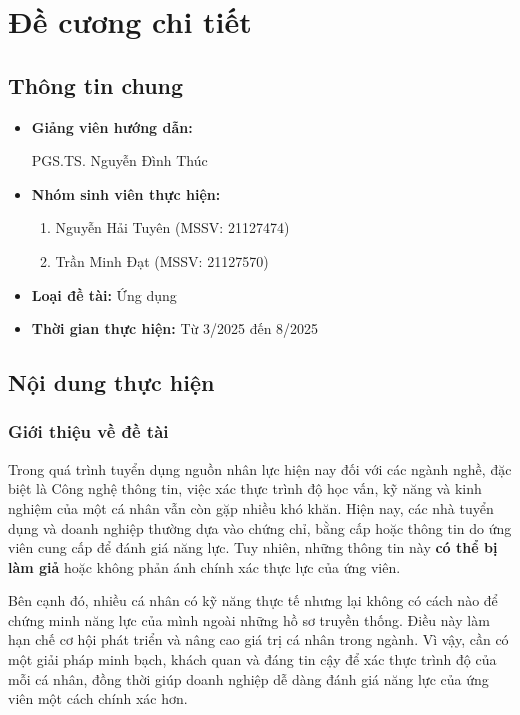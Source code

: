 \chapter*{Đề cương chi tiết}

\renewcommand{\thesection}{\arabic{section}}

\section{Thông tin chung}

\begin{itemize}[label = {}]
  \item \textbf{Giảng viên hướng dẫn:}
        \begin{itemize}
          PGS.TS. Nguyễn Đình Thúc
        \end{itemize}{}
  \item \textbf{Nhóm sinh viên thực hiện:}
        \begin{enumerate}
          \item Nguyễn Hải Tuyên (MSSV: 21127474)
          \item Trần Minh Đạt (MSSV: 21127570)
        \end{enumerate}
  \item \textbf{Loại đề tài:} Ứng dụng
  \item \textbf{Thời gian thực hiện:} Từ 3/2025 đến 8/2025
\end{itemize}

\section{Nội dung thực hiện}

\subsection{Giới thiệu về đề tài}

Trong quá trình tuyển dụng nguồn nhân lực hiện nay đối với các ngành nghề, đặc biệt là Công nghệ thông tin,
việc xác thực trình độ học vấn, kỹ năng và kinh nghiệm của một cá nhân vẫn còn gặp nhiều khó khăn.
Hiện nay, các nhà tuyển dụng và doanh nghiệp thường dựa vào chứng chỉ, bằng cấp hoặc thông tin do ứng viên cung cấp để đánh giá năng lực.
Tuy nhiên, những thông tin này \textbf{có thể bị làm giả} hoặc không phản ánh chính xác thực lực của ứng viên.

Bên cạnh đó, nhiều cá nhân có kỹ năng thực tế nhưng lại không có cách nào để chứng minh năng lực của mình ngoài những hồ sơ truyền thống.
Điều này làm hạn chế cơ hội phát triển và nâng cao giá trị cá nhân trong ngành.
Vì vậy, cần có một giải pháp minh bạch, khách quan và đáng tin cậy để xác thực trình độ của mỗi cá nhân,
đồng thời giúp doanh nghiệp dễ dàng đánh giá năng lực của ứng viên một cách chính xác hơn.

